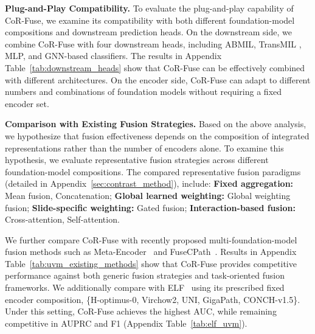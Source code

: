 \textbf{Plug-and-Play Compatibility.}
To evaluate the plug-and-play capability of CoR-Fuse, we examine its compatibility with both different foundation-model compositions and downstream prediction heads. 
On the downstream side, we combine CoR-Fuse with four downstream heads, including ABMIL, TransMIL \citep{transMIL}, MLP, and GNN-based classifiers.
The results in Appendix Table~\ref{tab:downstream_heads} show that CoR-Fuse can be effectively combined with different architectures.
On the encoder side, CoR-Fuse can adapt to different numbers and combinations of foundation models without requiring a fixed encoder set.

\textbf{Comparison with Existing Fusion Strategies.}
Based on the above analysis, we hypothesize that fusion effectiveness depends on the composition of integrated representations rather than the number of encoders alone.
To examine this hypothesis, we evaluate representative fusion strategies across different foundation-model compositions. 
The compared representative fusion paradigms (detailed in Appendix~\ref{sec:contrast_method}), include: \textbf{Fixed aggregation:} Mean fusion, Concatenation; \textbf{Global learned weighting:} Global weighting fusion; \textbf{Slide-specific weighting:} Gated fusion; \textbf{Interaction-based fusion:} Cross-attention, Self-attention.

We further compare CoR-Fuse with recently proposed multi-foundation-model fusion methods such as Meta-Encoder~\citep{gao2026metaencoder} and FuseCPath~\citep{yang2025fusecpath}.
Results in Appendix Table~\ref{tab:uvm_existing_methods} show that CoR-Fuse provides competitive performance against both generic fusion strategies and task-oriented fusion frameworks.
We additionally compare with ELF~\citep{luo2025elf} using its prescribed fixed encoder composition, \{H-optimus-0, Virchow2, UNI, GigaPath, CONCH-v1.5\}. Under this setting, CoR-Fuse achieves the highest AUC, while remaining competitive in AUPRC and F1 (Appendix Table~\ref{tab:elf_uvm}).

